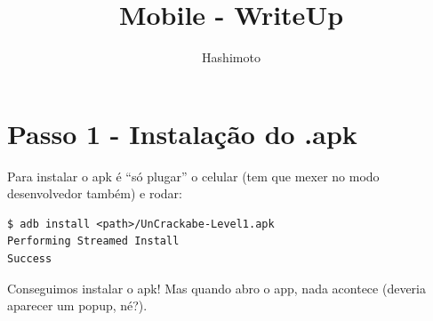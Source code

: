 \documentclass{article}
\begin{document}
\title{Mobile - WriteUp}
\author{Hashimoto}
\date{}
\maketitle

\section*{Passo 1 - Instalação do .apk}

Para instalar o apk é ``só plugar'' o celular
(tem que mexer no modo desenvolvedor também)
e rodar:
\begin{verbatim}
$ adb install <path>/UnCrackabe-Level1.apk
Performing Streamed Install
Success
\end{verbatim}
Conseguimos instalar o apk!
Mas quando abro o app, nada acontece
(deveria aparecer um popup, né?).
\end{document}
